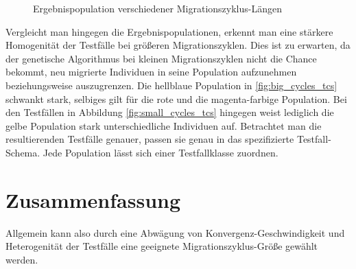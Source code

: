\documentclass[12pt,a4paper]{article}
\begin{document}
\begin{figure}
\centering
{}
\caption{Ergebnispopulation verschiedener Migrationszyklus-Längen}
\end{figure}
Vergleicht man hingegen die Ergebnispopulationen, erkennt man eine stärkere Homogenität der Testfälle bei größeren Migrationszyklen. Dies ist zu erwarten, da der genetische Algorithmus bei kleinen Migrationszyklen nicht die Chance bekommt, neu migrierte Individuen in seine Population aufzunehmen beziehungsweise auszugrenzen. Die hellblaue Population in \ref{fig:big_cycles_tcs} schwankt stark, selbiges gilt für die rote und die magenta-farbige Population. Bei den Testfällen in Abbildung \ref{fig:small_cycles_tcs} hingegen weist lediglich die gelbe Population stark unterschiedliche Individuen auf. Betrachtet man die resultierenden Testfälle genauer, passen sie genau in das spezifizierte Testfall-Schema. Jede Population lässt sich einer Testfallklasse zuordnen.

\section{Zusammenfassung}
Allgemein kann also durch eine Abwägung von Konvergenz-Geschwindigkeit und Heterogenität der Testfälle eine geeignete Migrationszyklus-Größe gewählt werden.
\end{document}
